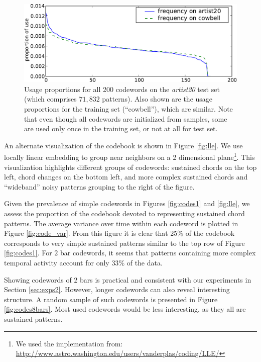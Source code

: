 \documentclass{article}
\begin{document}
\begin{figure}[t]
\begin{center}
\includegraphics[width=.99\columnwidth]{freqs}
\end{center}
\caption{\small{Usage proportions for all 200 codewords 
on the {\it artist20} test set (which comprises $71,832$
patterns).  Also shown are the usage proportions for the training set (``cowbell''), 
which are similar.
Note that even though all codewords are initialized from samples, some
are used only once in the training set, or not at all for test set.
}}
\label{fig:freqs}
\end{figure}

An alternate visualization of the codebook is shown in Figure
\ref{fig:lle}.  We use locally linear embedding \cite{Roweis2000} to
group near neighbors on a 2 dimensional plane\footnote{We used the
  implementation from:
  \url{http://www.astro.washington.edu/users/vanderplas/coding/LLE/}}.
This visualization highlights different groups of codewords: sustained
chords on the top left, chord changes on the bottom left, and more
complex sustained chords and ``wideband'' noisy patterns grouping to
the right of the figure.

Given the prevalence of simple codewords in Figures \ref{fig:codes1}
and \ref{fig:lle}, we assess the proportion of the codebook devoted to
representing sustained chord patterns.  The average variance over time
within each codeword is plotted in Figure \ref{fig:code_var}.  From
this figure it is clear that 25\% of the codebook corresponds to very
simple sustained patterns similar to the top row of Figure
\ref{fig:codes1}. For $2$ bar codewords, it seems that patterns
containing more complex temporal activity account for only $33$\% of
the data.

Showing codewords of $2$ bars is practical and consistent with our experiments
in Section \ref{sec:exps2}. However, longer codewords can also reveal
interesting structure. A random sample of such codewords is presented
in Figure \ref{fig:codes8bars}. Most used codewords would be less interesting,
as they all are sustained patterns.
\end{document}

